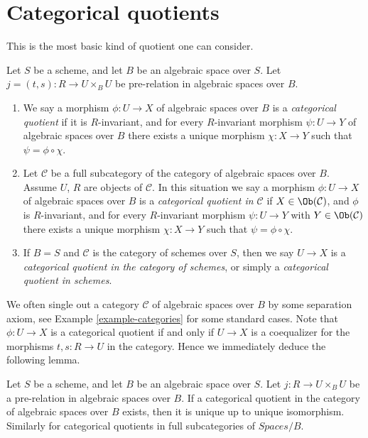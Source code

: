 \section{Categorical quotients}
\label{section-categorical}

\noindent
This is the most basic kind of quotient one can consider.

\begin{definition}
\label{definition-categorical}
Let $S$ be a scheme, and let $B$ be an algebraic space over $S$.
Let $j = (t, s) : R \to U \times_B U$ be pre-relation in algebraic spaces
over $B$.
\begin{enumerate}
\item We say a morphism $\phi : U \to X$ of algebraic spaces over $B$
is a {\it categorical quotient} if it is $R$-invariant, and
for every $R$-invariant morphism $\psi : U \to Y$ of algebraic spaces over $B$
there exists a unique morphism $\chi : X \to Y$ such that
$\psi = \phi \circ \chi$.
\item Let $\mathcal{C}$ be a full subcategory of the category of algebraic
spaces over $B$. Assume $U$, $R$ are objects of $\mathcal{C}$.
In this situation we say
a morphism $\phi : U \to X$ of algebraic spaces over $B$
is a {\it categorical quotient in $\mathcal{C}$}
if $X \in \Ob(\mathcal{C})$, and $\phi$ is $R$-invariant,
and for every $R$-invariant morphism
$\psi : U \to Y$ with $Y \in \Ob(\mathcal{C})$
there exists a unique morphism $\chi : X \to Y$ such
that $\psi = \phi \circ \chi$.
\item If $B = S$ and $\mathcal{C}$ is the category of schemes over $S$,
then we say $U \to X$ is a
{\it categorical quotient in the category of schemes}, or simply a
{\it categorical quotient in schemes}.
\end{enumerate}
\end{definition}

\noindent
We often single out a category $\mathcal{C}$ of algebraic spaces over $B$
by some separation axiom, see
Example \ref{example-categories}
for some standard cases.
Note that $\phi : U \to X$ is a categorical quotient if and only
if $U \to X$ is a coequalizer for the
morphisms $t, s : R \to U$ in the category. Hence we immediately
deduce the following lemma.

\begin{lemma}
\label{lemma-categorical-unique}
Let $S$ be a scheme, and let $B$ be an algebraic space over $S$.
Let $j : R \to U \times_B U$ be a pre-relation in algebraic spaces over $B$.
If a categorical quotient in the category of algebraic spaces
over $B$ exists, then it is unique up to unique isomorphism.
Similarly for categorical quotients in full subcategories of
$\textit{Spaces}/B$.
\end{lemma}

